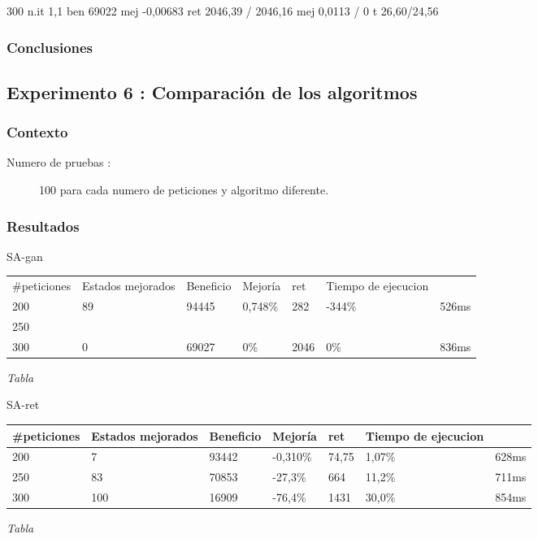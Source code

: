 \documentclass{article}
\begin{document}
300
n.it 1,1
ben 69022
mej -0,00683
ret 2046,39 / 2046,16
mej 0,0113 / 0
t 26,60/24,56

\subsubsection{Conclusiones}

\subsection{Experimento 6 : Comparación de los algoritmos}

\subsubsection{Contexto}
\begin{description}
\item[Numero de pruebas :] 100 para cada numero de peticiones y algoritmo
diferente.
\end{description}

\subsubsection{Resultados}
SA-gan
\begin{center}
\begin{tabular}{|l||l|l|l||l|l|l|}
\hline
\#peticiones & Estados mejorados & Beneficio & Mejoría & ret & Tiempo de
ejecucion\\
200 & 89 & 94445 & 0,748\% & 282 & -344\% & 526ms\\
\hline
250 & & & & & & \\
\hline
300 & 0 & 69027 & 0\% & 2046 & 0\% & 836ms\\
\hline
\end{tabular}
{\it Tabla}
\end{center}
SA-ret
\begin{center}
\begin{tabular}{|l||l|l|l||l|l|l|}
\hline
\#peticiones & Estados mejorados & Beneficio & Mejoría & ret & Tiempo de
ejecucion\\
\hline
200 & 7 & 93442 & -0,310\% & 74,75 & 1,07\% & 628ms\\
\hline
250 & 83 & 70853 & -27,3\% & 664 & 11,2\% & 711ms\\
\hline
300 & 100 & 16909 & -76,4\% & 1431 & 30,0\% & 854ms\\
\hline
\end{tabular}
{\it Tabla}
\end{center}
\end{document}

